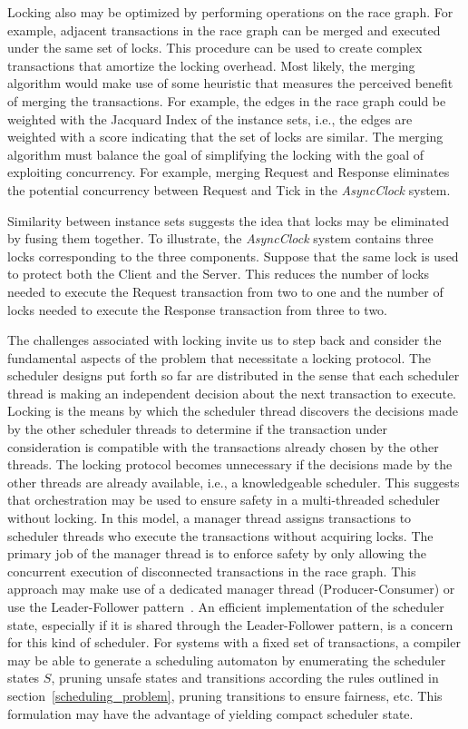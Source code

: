 Locking also may be optimized by performing operations on the race graph.
For example, adjacent transactions in the race graph can be merged and executed under the same set of locks.
This procedure can be used to create complex transactions that amortize the locking overhead.
Most likely, the merging algorithm would make use of some heuristic that measures the perceived benefit of merging the transactions.
For example, the edges in the race graph could be weighted with the Jacquard Index of the instance sets, i.e., the edges are weighted with a score indicating that the set of locks are similar.
The merging algorithm must balance the goal of simplifying the locking with the goal of exploiting concurrency.
For example, merging Request and Response eliminates the potential concurrency between Request and Tick in the \emph{AsyncClock} system.

Similarity between instance sets suggests the idea that locks may be eliminated by fusing them together.
To illustrate, the \emph{AsyncClock} system contains three locks corresponding to the three components.
Suppose that the same lock is used to protect both the Client and the Server.
This reduces the number of locks needed to execute the Request transaction from two to one and the number of locks needed to execute the Response transaction from three to two.

The challenges associated with locking invite us to step back and consider the fundamental aspects of the problem that necessitate a locking protocol.
The scheduler designs put forth so far are distributed in the sense that each scheduler thread is making an independent decision about the next transaction to execute.
Locking is the means by which the scheduler thread discovers the decisions made by the other scheduler threads to determine if the transaction under consideration is compatible with the transactions already chosen by the other threads.
The locking protocol becomes unnecessary if the decisions made by the other threads are already available, i.e., a knowledgeable scheduler.
This suggests that orchestration may be used to ensure safety in a multi-threaded scheduler without locking.
In this model, a manager thread assigns transactions to scheduler threads who execute the transactions without acquiring locks.
The primary job of the manager thread is to enforce safety by only allowing the concurrent execution of disconnected transactions in the race graph.
This approach may make use of a dedicated manager thread (Producer-Consumer) or use the Leader-Follower pattern~\cite{schmidt2000pattern}.
An efficient implementation of the scheduler state, especially if it is shared through the Leader-Follower pattern, is a concern for this kind of scheduler.
For systems with a fixed set of transactions, a compiler may be able to generate a scheduling automaton by enumerating the scheduler states $S$, pruning unsafe states and transitions according the rules outlined in section~\ref{scheduling_problem}, pruning transitions to ensure fairness, etc.
This formulation may have the advantage of yielding compact scheduler state.

